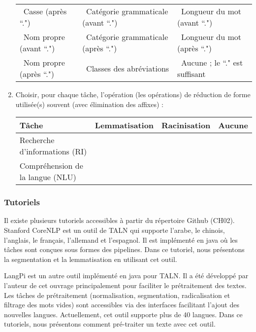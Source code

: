 \documentclass{KodeBook}
\begin{document}
\begin{enumerate}
	\begin{tabular}{|lll|}
		\hline 
		\Square\ Casse (après ``.") & \Square\ Catégorie grammaticale (avant ``.") & \Square\ Longueur du mot (avant ``.")\\
		\Square\ Nom propre (avant ``.")& \Square\ Catégorie grammaticale (après ``.")& \Square\ Longueur du mot (après ``.")\\
		\Square\ Nom propre (après ``.") & \Square\ Classes des abréviations& \Square\ Aucune ; le ``." est suffisant\\
		\hline
	\end{tabular}

	\item Choisir, pour chaque tâche, l'opération (les opérations)  de réduction de forme utilisée(s) souvent (avec élimination des affixes) :
	
	\begin{tabular}{|llll|}
		\hline 
		Tâche & Lemmatisation & Racinisation & Aucune\\
		\hline
		Recherche d'informations (RI) & \Square & \Square & \Square \\
		Compréhension de la langue (NLU) & \Square & \Square & \Square \\
		\hline
	\end{tabular}
	
\end{enumerate}


\subsubsection*{Tutoriels}

Il existe plusieurs tutoriels accessibles à partir du répertoire Github (CH02).
Stanford CoreNLP est un outil de TALN qui supporte l'arabe, le chinois, l'anglais, le français, l'allemand et l'espagnol.
Il est implémenté en java où les tâches sont conçues sous formes des pipelines.
Dans ce tutoriel, nous présentons la segmentation et la lemmatisation en utilisant cet outil.

LangPi est un autre outil implémenté en java pour TALN.
Il a été développé par l'auteur de cet ouvrage principalement pour faciliter le prétraitement des textes.
Les tâches de prétraitement (normalisation, segmentation, radicalisation et filtrage des mots vides) sont accessibles via des interfaces facilitant l'ajout des nouvelles langues.
Actuellement, cet outil supporte plus de 40 langues.
Dans ce tutoriels, nous présentons comment pré-traiter un texte avec cet outil.
\end{document}
